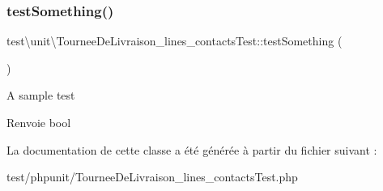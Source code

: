 \subsubsection{\texorpdfstring{test\+Something()}{testSomething()}}
{\footnotesize\ttfamily test\textbackslash{}unit\textbackslash{}\+Tournee\+De\+Livraison\+\_\+lines\+\_\+contacts\+Test\+::test\+Something (\begin{DoxyParamCaption}{ }\end{DoxyParamCaption})}

A sample test \begin{DoxyReturn}{Renvoie}
bool 
\end{DoxyReturn}


La documentation de cette classe a été générée à partir du fichier suivant \+:\begin{DoxyCompactItemize}
\item 
test/phpunit/Tournee\+De\+Livraison\+\_\+lines\+\_\+contacts\+Test.\+php\end{DoxyCompactItemize}

